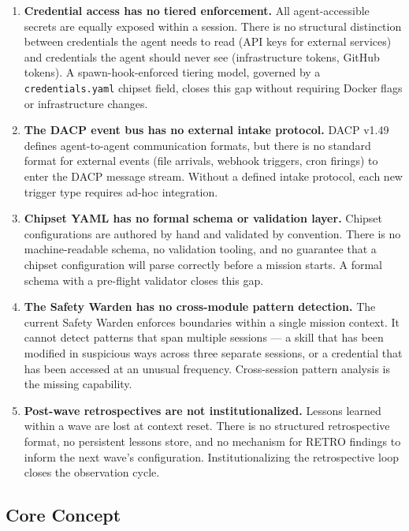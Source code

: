 \documentclass[11pt,letterpaper]{article}
\begin{document}
\begin{enumerate}
  \item \textbf{Credential access has no tiered enforcement.} All agent-accessible secrets are equally exposed within a session. There is no structural distinction between credentials the agent needs to read (API keys for external services) and credentials the agent should never see (infrastructure tokens, GitHub tokens). A spawn-hook-enforced tiering model, governed by a \texttt{credentials.yaml} chipset field, closes this gap without requiring Docker flags or infrastructure changes.

  \item \textbf{The DACP event bus has no external intake protocol.} DACP v1.49 defines agent-to-agent communication formats, but there is no standard format for external events (file arrivals, webhook triggers, cron firings) to enter the DACP message stream. Without a defined intake protocol, each new trigger type requires ad-hoc integration.

  \item \textbf{Chipset YAML has no formal schema or validation layer.} Chipset configurations are authored by hand and validated by convention. There is no machine-readable schema, no validation tooling, and no guarantee that a chipset configuration will parse correctly before a mission starts. A formal schema with a pre-flight validator closes this gap.

  \item \textbf{The Safety Warden has no cross-module pattern detection.} The current Safety Warden enforces boundaries within a single mission context. It cannot detect patterns that span multiple sessions --- a skill that has been modified in suspicious ways across three separate sessions, or a credential that has been accessed at an unusual frequency. Cross-session pattern analysis is the missing capability.

  \item \textbf{Post-wave retrospectives are not institutionalized.} Lessons learned within a wave are lost at context reset. There is no structured retrospective format, no persistent lessons store, and no mechanism for RETRO findings to inform the next wave's configuration. Institutionalizing the retrospective loop closes the observation cycle.
\end{enumerate}

\subsection{Core Concept}
\end{document}
